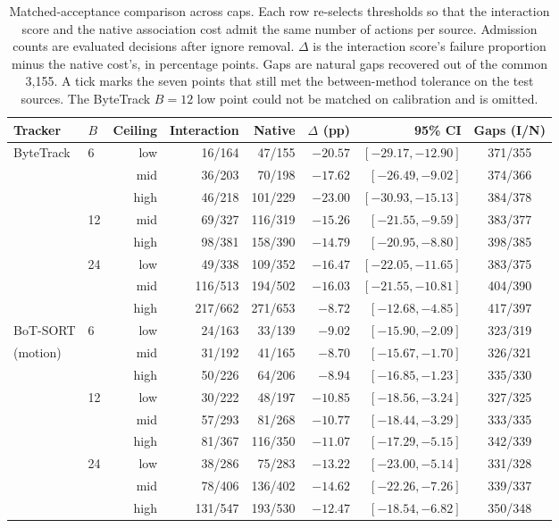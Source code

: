 \begin{table}[t]
\centering
\small
\caption{Matched-acceptance comparison across caps. Each row re-selects
thresholds so that the interaction score and the native association cost
admit the same number of actions per source. Admission counts are
evaluated decisions after ignore removal. $\Delta$ is the interaction
score's failure proportion minus the native cost's, in percentage points.
Gaps are natural gaps recovered out of the common 3,155. A tick marks
the seven points that still met the between-method tolerance on the test
sources. The ByteTrack $B=12$ low point could not be matched on
calibration and is omitted.}
\label{tab:caps}
\begin{tabular}{llrrrrrc}
\hline
Tracker & $B$ & Ceiling & Interaction & Native & $\Delta$ (pp) & 95\% CI & Gaps (I/N) \\
\hline
ByteTrack & 6 & low & 16/164 & 47/155 & $-20.57$ & $[-29.17,-12.90]$ & 371/355 \\
 & & mid & 36/203 & 70/198 & $-17.62$ & $[-26.49,-9.02]$ & 374/366 \\
 & & high & 46/218 & 101/229 & $-23.00$ & $[-30.93,-15.13]$ & 384/378 \\
 & 12 & mid & 69/327 & 116/319 & $-15.26$ & $[-21.55,-9.59]$ & 383/377 \\
 & & high & 98/381 & 158/390 & $-14.79$ & $[-20.95,-8.80]$ & 398/385 \\
 & 24 & low & 49/338 & 109/352 & $-16.47$ & $[-22.05,-11.65]$ & 383/375 \\
 & & mid & 116/513 & 194/502 & $-16.03$ & $[-21.55,-10.81]$ & 404/390 \\
 & & high & 217/662 & 271/653 & $-8.72$ & $[-12.68,-4.85]$ & 417/397 \\
\hline
BoT-SORT & 6 & low & 24/163 & 33/139 & $-9.02$ & $[-15.90,-2.09]$ & 323/319 \\
(motion) & & mid & 31/192 & 41/165 & $-8.70$ & $[-15.67,-1.70]$ & 326/321 \\
 & & high & 50/226 & 64/206 & $-8.94$ & $[-16.85,-1.23]$ & 335/330 \\
 & 12 & low & 30/222 & 48/197 & $-10.85$ & $[-18.56,-3.24]$ & 327/325 \\
 & & mid & 57/293 & 81/268 & $-10.77$ & $[-18.44,-3.29]$ & 333/335 \\
 & & high & 81/367 & 116/350 & $-11.07$ & $[-17.29,-5.15]$ & 342/339 \\
 & 24 & low & 38/286 & 75/283 & $-13.22$ & $[-23.00,-5.14]$ & 331/328 \\
 & & mid & 78/406 & 136/402 & $-14.62$ & $[-22.26,-7.26]$ & 339/337 \\
 & & high & 131/547 & 193/530 & $-12.47$ & $[-18.54,-6.82]$ & 350/348 \\
\hline
\end{tabular}
\end{table}

